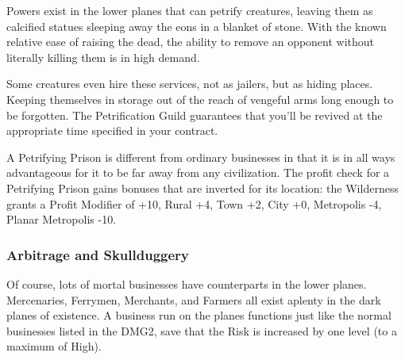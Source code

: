 Powers exist in the lower planes that can petrify creatures, leaving them as calcified statues sleeping away the eons in a blanket of stone. With the known relative ease of raising the dead, the ability to remove an opponent without literally killing them is in high demand.

Some creatures even hire these services, not as jailers, but as hiding places. Keeping themselves in storage out of the reach of vengeful arms long enough to be forgotten. The Petrification Guild guarantees that you'll be revived at the appropriate time specified in your contract.

A Petrifying Prison is different from ordinary businesses in that it is in all ways advantageous for it to be far away from any civilization. The profit check for a Petrifying Prison gains bonuses that are inverted for its location: the Wilderness grants a Profit Modifier of +10, Rural +4, Town +2, City +0, Metropolis -4, Planar Metropolis -10.


\subsubsection{Arbitrage and Skullduggery}

Of course, lots of mortal businesses have counterparts in the lower planes. Mercenaries, Ferrymen, Merchants, and Farmers all exist aplenty in the dark planes of existence. A business run on the planes functions just like the normal businesses listed in the DMG2, save that the Risk is increased by one level (to a maximum of High).
